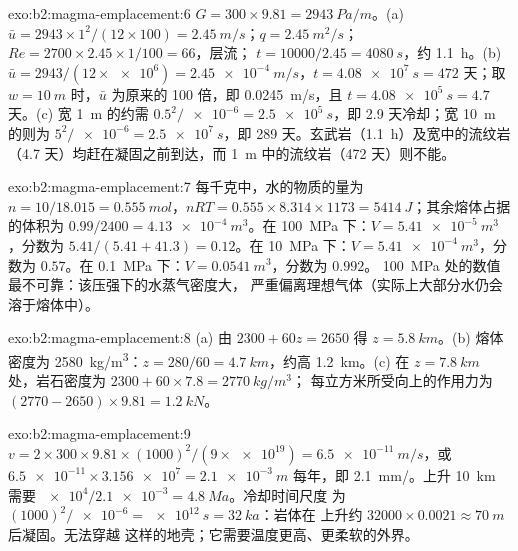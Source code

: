 \begin{solution}{exo:b2:magma-emplacement:6}
$G = 300\times9.81 = \qty{2943}{Pa/m}$。(a) $\bar u = 2943\times1^2/(12\times100) =
\qty{2.45}{m/s}$；$q = \qty{2.45}{m^2/s}$；$Re = 2700\times2.45\times1/100 = 66$，层流；
$t = 10000/2.45 = \qty{4080}{s}$，约 \qty{1.1}{h}。(b) $\bar u =
2943/(12\times\num{e6}) = \qty{2.45e-4}{m/s}$，$t = \qty{4.08e7}{s} = 472$ 天；取
$w = \qty{10}{m}$ 时，$\bar u$ 为原来的 100 倍，即 \qty{0.0245}{m/s}，且 $t =
\qty{4.08e5}{s} = 4.7$ 天。(c) 宽 \qty{1}{m} 的约需
$0.5^2/\num{e-6} = \qty{2.5e5}{s}$，即 2.9 天冷却；宽 \qty{10}{m} 的则为 $5^2/\num{e-6} =
\qty{2.5e7}{s}$，即 289 天。玄武岩（\qty{1.1}{h}）及宽中的流纹岩
（4.7 天）均赶在凝固之前到达，而
\qty{1}{m} 中的流纹岩（472 天）则不能。
\end{solution}

\begin{solution}{exo:b2:magma-emplacement:7}
每千克中，水的物质的量为 $n = 10/18.015 = \qty{0.555}{mol}$，$nRT =
0.555\times8.314\times1173 = \qty{5414}{J}$；其余熔体占据的体积为 $0.99/2400 =
\qty{4.13e-4}{m^3}$。在 \qty{100}{MPa} 下：$V = \qty{5.41e-5}{m^3}$，分数为
$5.41/(5.41 + 41.3) = 0.12$。在 \qty{10}{MPa} 下：$V = \qty{5.41e-4}{m^3}$，分数为
$0.57$。在 \qty{0.1}{MPa} 下：$V = \qty{0.0541}{m^3}$，分数为 $0.992$。
\qty{100}{MPa} 处的数值最不可靠：该压强下的水蒸气密度大，
严重偏离理想气体（实际上大部分水仍会溶于熔体中）。
\end{solution}

\begin{solution}{exo:b2:magma-emplacement:8}
(a) 由 $2300 + 60z = 2650$ 得 $z = \qty{5.8}{km}$。(b) 熔体
密度为 \qty{2580}{kg/m^3}：$z = 280/60 = \qty{4.7}{km}$，约高 \qty{1.2}{km}。(c)
在 $z = \qty{7.8}{km}$ 处，岩石密度为 $2300 + 60\times7.8 = \qty{2770}{kg/m^3}$；
每立方米所受向上的作用力为 $(2770 - 2650)\times9.81 = \qty{1.2}{kN}$。
\end{solution}

\begin{solution}{exo:b2:magma-emplacement:9}
$v = 2\times300\times9.81\times(1000)^2/(9\times\num{e19}) = \qty{6.5e-11}{m/s}$，或
$\num{6.5e-11}\times\num{3.156e7} = \qty{2.1e-3}{m}$ 每年，即 \qty{2.1}{mm/}。上升
\qty{10}{km} 需要 $\num{e4}/\num{2.1e-3} = \qty{4.8}{Ma}$。冷却时间尺度
为 $(1000)^2/\num{e-6} = \qty{e12}{s} = \qty{32}{ka}$：岩体在
上升约 $32000\times0.0021 \approx \qty{70}{m}$ 后凝固。无法穿越
这样的地壳；它需要温度更高、更柔软的外界。
\end{solution}

